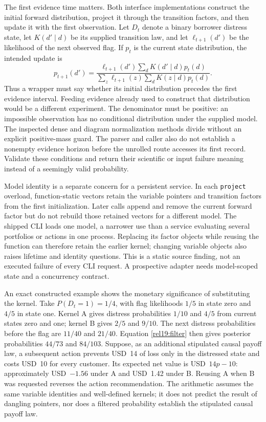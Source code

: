 The first evidence time matters. Both interface implementations construct the
initial forward distribution, project it through the transition factors, and
then update it with the first observation. Let $D_t$ denote a binary borrower
distress state, let $K(d'\mid d)$ be its supplied transition law, and let
$\ell_{t+1}(d')$ be the likelihood of the next observed flag. If $p_t$ is the
current state distribution, the intended update is
\begin{equation}
 p_{t+1}(d')=
 \frac{\ell_{t+1}(d')\sum_d K(d'\mid d)p_t(d)}
 {\sum_z\ell_{t+1}(z)\sum_d K(z\mid d)p_t(d)}.
 \label{rel19:filter}
\end{equation}
Thus a wrapper must say whether its initial distribution precedes the first
evidence interval. Feeding evidence already used to construct that distribution
would be a different experiment. The denominator must be positive: an
impossible observation has no conditional distribution under the supplied
model. The inspected dense and diagram normalization methods divide without
an explicit positive-mass guard. The parser and caller also do not establish
a nonempty evidence horizon before the unrolled route accesses its first
record. Validate these conditions and return their scientific or input failure
meaning instead of a seemingly valid probability. \citep{rel19dbnpp}

Model identity is a separate concern for a persistent service. In each
\texttt{project} overload, function-static vectors retain the variable pointers
and transition factors from the first initialization. Later calls append and
remove the current forward factor but do not rebuild those retained vectors
for a different model. The shipped CLI loads one model, a narrower use than
a service evaluating several portfolios or actions in one process. Replacing
its factor objects while reusing the function can therefore retain the earlier
kernel; changing variable objects also raises lifetime and identity questions.
This is a static source finding, not an executed failure of every CLI request.
A prospective adapter needs model-scoped state and a concurrency contract.
\citep{rel19dbnpp}

An exact constructed example shows the monetary significance of substituting
the kernel. Take $P(D_t=1)=1/4$, with flag likelihoods $1/5$ in state zero and
$4/5$ in state one. Kernel A gives distress probabilities $1/10$ and $4/5$
from current states zero and one; kernel B gives $2/5$ and $9/10$. The next
distress probabilities before the flag are $11/40$ and $21/40$. Equation
\eqref{rel19:filter} then gives posterior probabilities $44/73$ and $84/103$.
Suppose, as an additional stipulated causal payoff law, a subsequent action
prevents USD~14 of loss only in the distressed state and costs USD~10 for
every customer. Its expected net value is USD~$14p-10$: approximately
USD~$-1.56$ under A and USD~1.42 under B. Reusing A when B was requested reverses
the action recommendation. The arithmetic assumes the same variable identities
and well-defined kernels; it does not predict the result of dangling pointers,
nor does a filtered probability establish the stipulated causal payoff law.
\citep{rel19dbnwitness}

